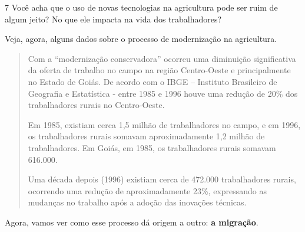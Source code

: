 \num{7} Você acha que o uso de novas tecnologias na agricultura pode ser ruim de
algum jeito? No que ele impacta na vida dos trabalhadores?


Veja, agora, alguns dados sobre o processo de modernização na agricultura.

\begin{quote}
Com a “modernização conservadora” ocorreu uma diminuição significativa
da oferta de trabalho no campo na região Centro-Oeste e principalmente
no Estado de Goiás. De acordo com o IBGE – Instituto Brasileiro de
Geografia e Estatística - entre 1985 e 1996 houve uma redução de 20\%
dos trabalhadores rurais no Centro-Oeste.

Em 1985, existiam cerca 1,5 milhão de trabalhadores no campo, e em 1996,
os trabalhadores rurais somavam aproximadamente 1,2 milhão de
trabalhadores. Em Goiás, em 1985, os trabalhadores rurais somavam
616.000.

Uma década depois (1996) existiam cerca de 472.000 trabalhadores rurais,
ocorrendo uma redução de aproximadamente 23\%, expressando as mudanças
no trabalho após a adoção das inovações técnicas.

\end{quote}


Agora, vamos ver como esse processo dá origem a outro: \textbf{a migração}.


